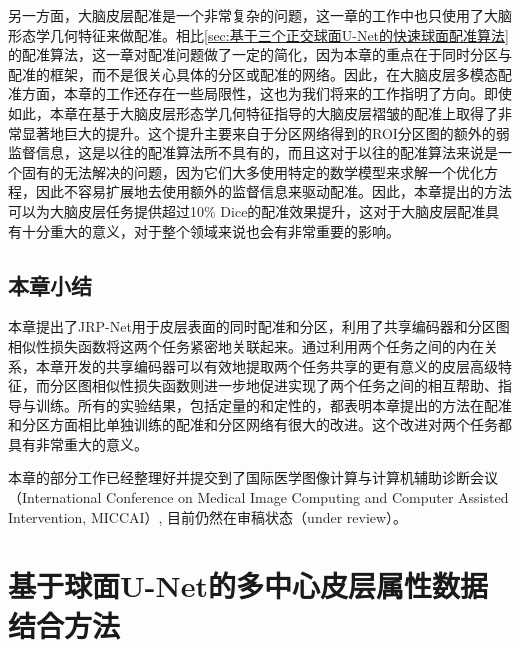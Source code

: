 另一方面，大脑皮层配准是一个非常复杂的问题，这一章的工作中也只使用了大脑形态学几何特征来做配准。相比\ref{sec:基于三个正交球面U-Net的快速球面配准算法}的配准算法，这一章对配准问题做了一定的简化，因为本章的重点在于同时分区与配准的框架，而不是很关心具体的分区或配准的网络。因此，在大脑皮层多模态配准方面，本章的工作还存在一些局限性，这也为我们将来的工作指明了方向。即使如此，本章在基于大脑皮层形态学几何特征指导的大脑皮层褶皱的配准上取得了非常显著地巨大的提升。这个提升主要来自于分区网络得到的ROI分区图的额外的弱监督信息，这是以往的配准算法所不具有的，而且这对于以往的配准算法来说是一个固有的无法解决的问题，因为它们大多使用特定的数学模型来求解一个优化方程，因此不容易扩展地去使用额外的监督信息来驱动配准。因此，本章提出的方法可以为大脑皮层任务提供超过10\% Dice的配准效果提升，这对于大脑皮层配准具有十分重大的意义，对于整个领域来说也会有非常重要的影响。

\section{本章小结}
本章提出了JRP-Net用于皮层表面的同时配准和分区，利用了共享编码器和分区图相似性损失函数将这两个任务紧密地关联起来。通过利用两个任务之间的内在关系，本章开发的共享编码器可以有效地提取两个任务共享的更有意义的皮层高级特征，而分区图相似性损失函数则进一步地促进实现了两个任务之间的相互帮助、指导与训练。所有的实验结果，包括定量的和定性的，都表明本章提出的方法在配准和分区方面相比单独训练的配准和分区网络有很大的改进。这个改进对两个任务都具有非常重大的意义。

%
        {
        }
        {
        本章的部分工作已经整理好并提交到了国际医学图像计算与计算机辅助诊断会议（International Conference on Medical Image Computing and Computer Assisted Intervention, MICCAI）, 目前仍然在审稿状态（under review）。
        }








\chapter{基于球面U-Net的多中心皮层属性数据结合方法}\label{sec:基于球面U-Net的多中心皮层属性数据结合方法}


